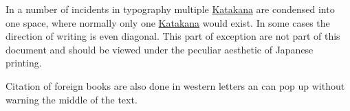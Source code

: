 In a number of incidents in typography multiple
\hyperref[sec:Katakana]{Katakana} are condensed into one space, where normally
only one \hyperref[sec:Katakana]{Katakana} would exist. In some cases the
direction of writing is even diagonal. This part of exception are not part of
this document and should be viewed under the peculiar aesthetic of Japanese
printing.


Citation of foreign books are also done in western letters an can pop up
without warning the middle of the text.
